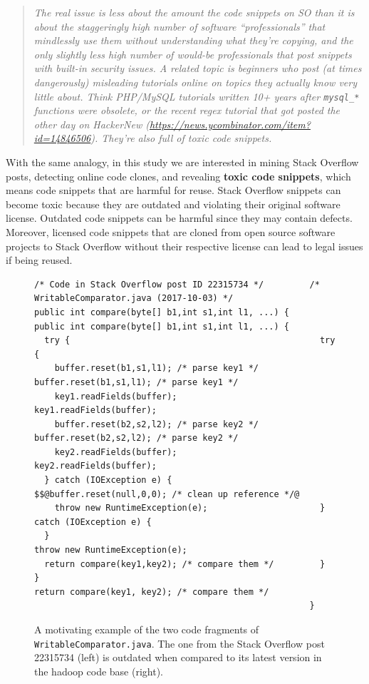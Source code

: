 \documentclass[10pt,journal,compsoc]{IEEEtran}
\begin{document}
\begin{quote}\textit{The real issue is less about the amount the code snippets
		on SO than it is about the staggeringly high number of software
		``professionals'' that mindlessly use them without understanding what they're
		copying, and the only slightly less high number of would-be professionals that
		post snippets with built-in security issues.  A related topic is beginners who
		post (at times dangerously) misleading tutorials online on topics they actually
		know very little about. Think PHP/MySQL tutorials written 10+ years after
		\texttt{mysql\_*} functions were obsolete, or the recent regex tutorial that
		got posted the other day on HackerNew
		(\url{https://news.ycombinator.com/item?id=14846506}). They're also full of
		toxic code snippets.}\end{quote}

With the same analogy, in this study we are interested in mining Stack Overflow
posts, detecting online code clones, and revealing \textbf{toxic code snippets},
which means code snippets that are harmful for reuse.
Stack Overflow snippets can become toxic because they are outdated and violating
their original software license. Outdated code snippets can be harmful since
they may contain defects. Moreover, licensed code snippets that are cloned from
open source software projects to Stack Overflow without their respective license
can lead to legal issues if being reused.

\begin{figure}
	\begin{lstlisting}
/* Code in Stack Overflow post ID 22315734 */         /* WritableComparator.java (2017-10-03) */
public int compare(byte[] b1,int s1,int l1, ...) {    public int compare(byte[] b1,int s1,int l1, ...) {
  try {                                                 try {
    buffer.reset(b1,s1,l1); /* parse key1 */              buffer.reset(b1,s1,l1); /* parse key1 */
    key1.readFields(buffer);                              key1.readFields(buffer);
    buffer.reset(b2,s2,l2); /* parse key2 */              buffer.reset(b2,s2,l2); /* parse key2 */
    key2.readFields(buffer);                              key2.readFields(buffer);
  } catch (IOException e) {                               $$@buffer.reset(null,0,0); /* clean up reference */@
    throw new RuntimeException(e);                      } catch (IOException e) {
  }                                                       throw new RuntimeException(e);
  return compare(key1,key2); /* compare them */         }
}                                                       return compare(key1, key2); /* compare them */
                                                      }
	\end{lstlisting}\vspace{-2ex}
	\caption{A motivating example of the two code fragments of
		{\small\texttt{WritableComparator.java}}. The one from the
		Stack Overflow post 22315734 (left) is outdated when compared to
		its latest version in the \textsf{hadoop} code base
		(right).}
	\label{fig:before-after}
\end{figure}
\end{document}

